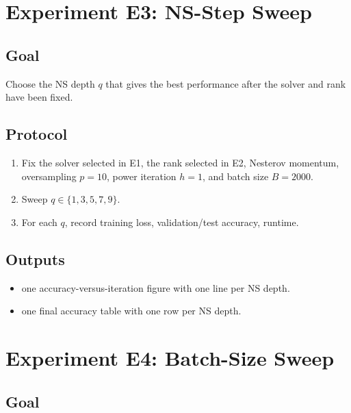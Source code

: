 \documentclass[11pt]{article}
\begin{document}
\section{Experiment E3: NS-Step Sweep}

\subsection{Goal}

Choose the NS depth $q$ that gives the best performance after the solver and rank have been fixed.

\subsection{Protocol}

\begin{enumerate}[nosep]
\item Fix the solver selected in E1, the rank selected in E2, Nesterov momentum, oversampling $p=10$, power iteration $h=1$, and batch size $B=2000$.
\item Sweep $q \in \{1, 3, 5, 7, 9\}$.
\item For each $q$, record training loss, validation/test accuracy, runtime.
\end{enumerate}

\subsection{Outputs}

\begin{itemize}[nosep]
\item one accuracy-versus-iteration figure with one line per NS depth.
\item one final accuracy table with one row per NS depth.
\end{itemize}


\section{Experiment E4: Batch-Size Sweep}

\subsection{Goal}
\end{document}
